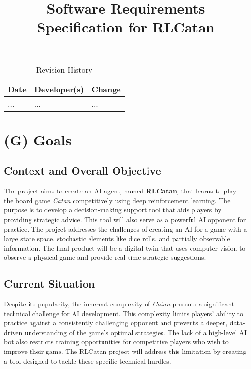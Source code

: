 \documentclass{article}
\title{Software Requirements Specification for RLCatan\\\progname}
\author{\authname}
\date{}
\begin{document}
\maketitle

\begin{table}[hp]
\caption{Revision History} \label{TblRevisionHistory}
\begin{tabularx}{\textwidth}{llX}
\toprule
\textbf{Date} & \textbf{Developer(s)} & \textbf{Change}\\
\midrule
... & ... & ...\\
\bottomrule
\end{tabularx}
\end{table}

\section*{(G) Goals}\label{sec:srs-goals}
\renewcommand{\thesubsection}{G.\arabic{subsection}}

\subsection{Context and Overall Objective}\label{subsec:context-and-overall-objective}
The project aims to create an AI agent, named \textbf{RLCatan}, that learns to play the board game \emph{Catan} competitively using deep reinforcement learning. The purpose is to develop a decision-making support tool that aids players by providing strategic advice. This tool will also serve as a powerful AI opponent for practice. The project addresses the challenges of creating an AI for a game with a large state space, stochastic elements like dice rolls, and partially observable information. The final product will be a digital twin that uses computer vision to observe a physical game and provide real-time strategic suggestions.

\subsection{Current Situation}\label{subsec:current-situation}
Despite its popularity, the inherent complexity of \emph{Catan} presents a significant technical challenge for AI development. This complexity limits players' ability to practice against a consistently challenging opponent and prevents a deeper, data-driven understanding of the game's optimal strategies. The lack of a high-level AI bot also restricts training opportunities for competitive players who wish to improve their game. The RLCatan project will address this limitation by creating a tool designed to tackle these specific technical hurdles.
\end{document}
